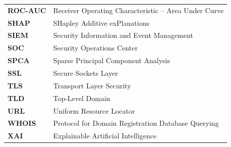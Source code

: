 \begin{singlespace}
\begin{tabular}{p{2.8cm} p{12.2cm}}
\textbf{ROC-AUC} & Receiver Operating Characteristic -- Area Under Curve \\
\textbf{SHAP} & SHapley Additive exPlanations \\
\textbf{SIEM} & Security Information and Event Management \\
\textbf{SOC} & Security Operations Center \\
\textbf{SPCA} & Sparse Principal Component Analysis \\
\textbf{SSL} & Secure Sockets Layer \\
\textbf{TLS} & Transport Layer Security \\
\textbf{TLD} & Top-Level Domain \\
\textbf{URL} & Uniform Resource Locator \\
\textbf{WHOIS} & Protocol for Domain Registration Database Querying \\
\textbf{XAI} & Explainable Artificial Intelligence \\
\end{tabular}
\end{singlespace}
